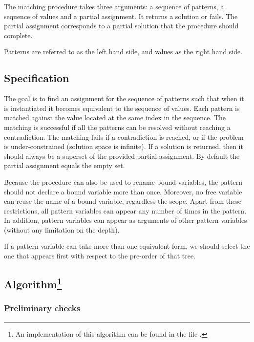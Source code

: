 The matching procedure takes three arguments: a sequence of patterns, a sequence of values and a partial assignment. It returns a solution or fails. The partial assignment corresponds to a partial solution that the procedure should complete.

Patterns are referred to as the left hand side, and values as the right hand side.

\subsection{Specification}

The goal is to find an assignment for the sequence of patterns such that when it is instantiated it becomes equivalent to the sequence of values. Each pattern is matched against the value located at the same index in the sequence. The matching is successful if all the patterns can be resolved without reaching a contradiction. The matching fails if a contradiction is reached, or if the problem is under-constrained (solution space is infinite). If a solution is returned, then it should always be a superset of the provided partial assignment. By default the partial assignment equals the empty set.

Because the procedure can also be used to rename bound variables, the pattern should not declare a bound variable more than once. Moreover, no free variable can reuse the name of a bound variable, regardless the scope. Apart from these restrictions, all pattern variables can appear any number of times in the pattern. In addition, pattern variables can appear as arguments of other pattern variables (without any limitation on the depth).

If a pattern variable can take more than one equivalent form, we should select the one that appears first with respect to the pre-order of that tree.

\subsection{Algorithm\texorpdfstring{\footnote{An implementation of this algorithm can be found in the file \href{https://github.com/FlorianCassayre/master-project/blob/master/src/main/scala/me/cassayre/florian/masterproject/front/proof/unification/UnificationUtils.scala}{}.}}{Lg}}

\subsubsection{Preliminary checks}

